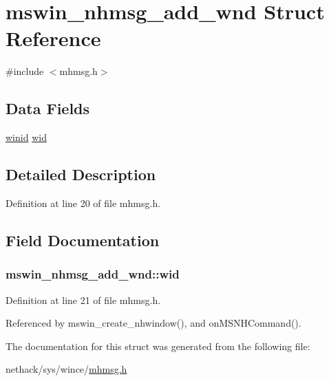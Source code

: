 \hypertarget{structmswin__nhmsg__add__wnd}{\section{mswin\+\_\+nhmsg\+\_\+add\+\_\+wnd Struct Reference}
\label{structmswin__nhmsg__add__wnd}
}


{\ttfamily \#include $<$mhmsg.\+h$>$}

\subsection*{Data Fields}
\begin{DoxyCompactItemize}
\item 
\hyperlink{wintype_8h_adc2de956a3f084b1691cf080e1d1412b}{winid} \hyperlink{structmswin__nhmsg__add__wnd_a15b37d8b9e61c6fe986469e012399c60}{wid}
\end{DoxyCompactItemize}


\subsection{Detailed Description}


Definition at line 20 of file mhmsg.\+h.



\subsection{Field Documentation}
\hypertarget{structmswin__nhmsg__add__wnd_a15b37d8b9e61c6fe986469e012399c60}{
\subsubsection[{wid}]{ mswin\+\_\+nhmsg\+\_\+add\+\_\+wnd\+::wid}}\label{structmswin__nhmsg__add__wnd_a15b37d8b9e61c6fe986469e012399c60}


Definition at line 21 of file mhmsg.\+h.



Referenced by mswin\+\_\+create\+\_\+nhwindow(), and on\+M\+S\+N\+H\+Command().



The documentation for this struct was generated from the following file\+:\begin{DoxyCompactItemize}
\item 
nethack/sys/wince/\hyperlink{sys_2wince_2mhmsg_8h}{mhmsg.\+h}\end{DoxyCompactItemize}
